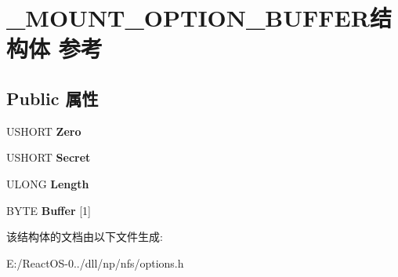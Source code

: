 \hypertarget{struct___m_o_u_n_t___o_p_t_i_o_n___b_u_f_f_e_r}{}\section{\+\_\+\+M\+O\+U\+N\+T\+\_\+\+O\+P\+T\+I\+O\+N\+\_\+\+B\+U\+F\+F\+E\+R结构体 参考}
\label{struct___m_o_u_n_t___o_p_t_i_o_n___b_u_f_f_e_r}
\subsection*{Public 属性}
\begin{DoxyCompactItemize}
\item 
\mbox{\label{struct___m_o_u_n_t___o_p_t_i_o_n___b_u_f_f_e_r_af9c2e16d8d3a4df0503521d8a3d5d857}} 
U\+S\+H\+O\+RT {\bfseries Zero}
\item 
\mbox{\label{struct___m_o_u_n_t___o_p_t_i_o_n___b_u_f_f_e_r_aeb142e89ff68d725f5076d38347a4837}} 
U\+S\+H\+O\+RT {\bfseries Secret}
\item 
\mbox{\label{struct___m_o_u_n_t___o_p_t_i_o_n___b_u_f_f_e_r_a24cb85dbb05f5a8e9d4a235646a2b841}} 
U\+L\+O\+NG {\bfseries Length}
\item 
\mbox{\label{struct___m_o_u_n_t___o_p_t_i_o_n___b_u_f_f_e_r_ac7d14bc0a4390d0b574a728bfb233e38}} 
B\+Y\+TE {\bfseries Buffer} \mbox{[}1\mbox{]}
\end{DoxyCompactItemize}


该结构体的文档由以下文件生成\+:\begin{DoxyCompactItemize}
\item 
E\+:/\+React\+O\+S-\/0../dll/np/nfs/options.\+h\end{DoxyCompactItemize}
